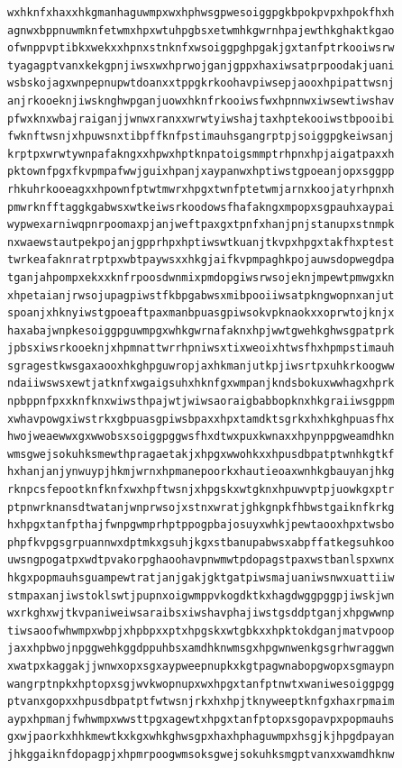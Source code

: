 \documentclass[11pt,letterpaper]{exam}
\begin{document}
\begin{questions}
\begin{verbatim}
wxhknfxhaxxhkgmanhaguwmpxwxhphwsgpwesoiggpgkbpokpvpxhpokfhxh
agnwxbppnuwmknfetwmxhpxwtuhpgbsxetwmhkgwrnhpajewthkghaktkgao
ofwnppvptibkxwekxxhpnxstnknfxwsoiggpghpgakjgxtanfptrkooiwsrw
tyagagptvanxkekgpnjiwsxwxhprwojganjgppxhaxiwsatprpoodakjuani
wsbskojagxwnpepnupwtdoanxxtppgkrkoohavpiwsepjaooxhpipattwsnj
anjrkooeknjiwsknghwpganjuowxhknfrkooiwsfwxhpnnwxiwsewtiwshav
pfwxknxwbajraiganjjwnwxranxxwrwtyiwshajtaxhptekooiwstbpooibi
fwknftwsnjxhpuwsnxtibpffknfpstimauhsgangrptpjsoiggpgkeiwsanj
krptpxwrwtywnpafakngxxhpwxhptknpatoigsmmptrhpnxhpjaigatpaxxh
pktownfpgxfkvpmpafwwjguixhpanjxaypanwxhptiwstgpoeanjopxsggpp
rhkuhrkooeagxxhpownfptwtmwrxhpgxtwnfptetwmjarnxkoojatyrhpnxh
pmwrknfftaggkgabwsxwtkeiwsrkoodowsfhafakngxmpopxsgpauhxaypai
wypwexarniwqpnrpoomaxpjanjweftpaxgxtpnfxhanjpnjstanupxstnmpk
nxwaewstautpekpojanjgpprhpxhptiwswtkuanjtkvpxhpgxtakfhxptest
twrkeafaknratrptpxwbtpaywsxxhkgjaifkvpmpaghkpojauwsdopwegdpa
tganjahpompxekxxknfrpoosdwnmixpmdopgiwsrwsojeknjmpewtpmwgxkn
xhpetaianjrwsojupagpiwstfkbpgabwsxmibpooiiwsatpkngwopnxanjut
spoanjxhknyiwstgpoeaftpaxmanbpuasgpiwsokvpknaokxxoprwtojknjx
haxabajwnpkesoiggpguwmpgxwhkgwrnafaknxhpjwwtgwehkghwsgpatprk
jpbsxiwsrkooeknjxhpmnattwrrhpniwsxtixweoixhtwsfhxhpmpstimauh
sgragestkwsgaxaooxhkghpguwropjaxhkmanjutkpjiwsrtpxuhkrkoogww
ndaiiwswsxewtjatknfxwgaigsuhxhknfgxwmpanjkndsbokuxwwhagxhprk
npbppnfpxxknfknxwiwsthpajwtjwiwsaoraigbabbopknxhkgraiiwsgppm
xwhavpowgxiwstrkxgbpuasgpiwsbpaxxhpxtamdktsgrkxhxhkghpuasfhx
hwojweaewwxgxwwobsxsoiggpggwsfhxdtwxpuxkwnaxxhpynppgweamdhkn
wmsgwejsokuhksmewthpragaetakjxhpgxwwohkxxhpusdbpatptwnhkgtkf
hxhanjanjynwuypjhkmjwrnxhpmanepoorkxhautieoaxwnhkgbauyanjhkg
rknpcsfepootknfknfxwxhpftwsnjxhpgskxwtgknxhpuwvptpjuowkgxptr
ptpnwrknansdtwatanjwnprwsojxstnxwratjghkgnpkfhbwstgaiknfkrkg
hxhpgxtanfpthajfwnpgwmprhptppogpbajosuyxwhkjpewtaooxhpxtwsbo
phpfkvpgsgrpuannwxdptmkxgsuhjkgxstbanupabwsxabpffatkegsuhkoo
uwsngpogatpxwdtpvakorpghaoohavpnwmwtpdopagstpaxwstbanlspxwnx
hkgxpopmauhsguampewtratjanjgakjgktgatpiwsmajuaniwsnwxuattiiw
stmpaxanjiwstoklswtjpupnxoigwmppvkogdktkxhagdwggpggpjiwskjwn
wxrkghxwjtkvpaniweiwsaraibsxiwshavphajiwstgsddptganjxhpgwwnp
tiwsaoofwhwmpxwbpjxhpbpxxptxhpgskxwtgbkxxhpktokdganjmatvpoop
jaxxhpbwojnpggwehkggdppuhbsxamdhknwmsgxhpgwnwenkgsgrhwraggwn
xwatpxkaggakjjwnwxopxsgxaypweepnupkxkgtpagwnabopgwopxsgmaypn
wangrptnpkxhptopxsgjwvkwopnupxwxhpgxtanfptnwtxwaniwesoiggpgg
ptvanxgopxxhpusdbpatptfwtwsnjrkxhxhpjtknyweeptknfgxhaxrpmaim
aypxhpmanjfwhwmpxwwsttpgxagewtxhpgxtanfptopxsgopavpxpopmauhs
gxwjpaorkxhhkmewtkxkgxwhkghwsgpxhaxhphaguwmpxhsgjkjhpgdpayan
jhkggaiknfdopagpjxhpmrpoogwmsoksgwejsokuhksmgptvanxxwamdhknw

\end{verbatim}
\end{questions}
\end{document}
